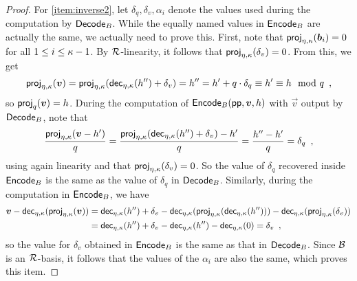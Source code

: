 \begin{proof}
\bigskip\noindent
For \autoref{item:inverse2}, let $\delta_q, \delta_v, \alpha_i$ denote the values used during the computation by $\mathsf{Decode}_B$.
While the equally named values in $\mathsf{Encode}_B$ are actually the same, we actually need to prove this.
First, note that $\mathsf{proj}_{\eta,\kappa}(\boldsymbol{b}_i) = 0$ for all $1\leq i \leq \kappa-1$.
By $\mathcal{R}$-linearity, it follows that $\mathsf{proj}_{\eta,\kappa}(\delta_v) = 0$. From this, we get
\[
 \mathsf{proj}_{\eta,\kappa}(\boldsymbol{v}) = \mathsf{proj}_{\eta,\kappa}(\mathsf{dec}_{\eta,\kappa}(h'') + \delta_v) = h'' = h' + q\cdot \delta_q \equiv h' \equiv h \mod q\enspace,
\]
so $\mathsf{proj}_{q}(\boldsymbol{v}) = h$.
During the computation of $\mathsf{Encode}_B(\mathsf{pp}, \boldsymbol{v}, h)$ with $\vec{v}$ output by $\mathsf{Decode}_B$, note that
\[
 \frac{\mathsf{proj}_{\eta,\kappa}(\boldsymbol{v} - h')}{q} = \frac{\mathsf{proj}_{\eta,\kappa}(\mathsf{dec}_{\eta,\kappa}(h'')+\delta_v)-h'}{q} = \frac{h''-h'}{q} = \delta_q\enspace,
\]
using again linearity and that $\mathsf{proj}_{\eta,\kappa}(\delta_v) = 0$.
So the value of $\delta_q$ recovered inside $\mathsf{Encode}_B$ is the same as the value of $\delta_q$ in $\mathsf{Decode}_B$.
Similarly, during the computation in $\mathsf{Encode}_B$, we have
\begin{align*}
 \boldsymbol{v}-\mathsf{dec}_{\eta,\kappa}(\mathsf{proj}_{\eta,\kappa}(\boldsymbol{v})) ={}& \mathsf{dec}_{\eta,\kappa}(h'') + \delta_v - \mathsf{dec}_{\eta,\kappa}(\mathsf{proj}_{\eta,\kappa}(\mathsf{dec}_{\eta,\kappa}(h''))) - \mathsf{dec}_{\eta,\kappa}(\mathsf{proj}_{\eta,\kappa}(\delta_v))\\
 ={}&\mathsf{dec}_{\eta,\kappa}(h'') + \delta_v - \mathsf{dec}_{\eta,\kappa}(h'') - \mathsf{dec}_{\eta,\kappa}(0) = \delta_v\enspace,
\end{align*}
so the value for $\delta_v$ obtained in $\mathsf{Encode}_B$ is the same as that in $\mathsf{Decode}_B$.
Since $\mathcal{B}$ is an $\mathcal{R}$-basis, it follows that the values of the $\alpha_i$ are also the same, which proves this item.


\end{proof}
